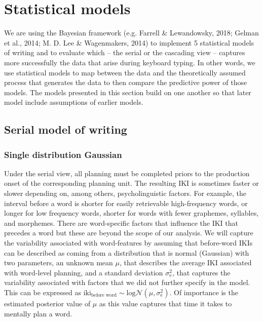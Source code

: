 \documentclass[
  man,floatsintext]{apa7}
\begin{document}
\newpage

\hypertarget{appendix-appendix}{%
\appendix}


\hypertarget{statistical-models}{%
\section{Statistical models}\label{statistical-models}}

We are using the Bayesian framework (e.g. Farrell \& Lewandowsky, 2018; Gelman et al., 2014; M. D. Lee \& Wagenmakers, 2014) to implement 5 statistical models of writing and to evaluate which -- the serial or the cascading view -- captures more successfully the data that arise during keyboard typing. In other words, we use statistical models to map between the data and the theoretically assumed process that generates the data to then compare the predictive power of those models. The models presented in this section build on one another so that later model include assumptions of earlier models.

\hypertarget{serial-model-of-writing}{%
\subsection{Serial model of writing}\label{serial-model-of-writing}}

\hypertarget{single-distribution-gaussian}{%
\subsubsection{Single distribution Gaussian}\label{single-distribution-gaussian}}

Under the serial view, all planning must be completed priors to the production onset of the corresponding planning unit. The resulting IKI is sometimes faster or slower depending on, among others, psycholinguistic factors. For example, the interval before a word is shorter for easily retrievable high-frequency words, or longer for low frequency words, shorter for words with fewer graphemes, syllables, and morphemes. There are word-specific factors that influence the IKI that precedes a word but these are beyond the scope of our analysis. We will capture the variability associated with word-features by assuming that before-word IKIs can be described as coming from a distribution that is normal (Gaussian) with two parameters, an unknown mean \(\mu\), that describes the average IKI associated with word-level planning, and a standard deviation \(\sigma_\text{e}^2\), that captures the variability associated with factors that we did not further specify in the model. This can be expressed as \(\text{iki}_\text{before word} \sim \text{log}\mathcal{N}(\mu, \sigma_\text{e}^2)\). Of importance is the estimated posterior value of \(\mu\) as this value captures that time it takes to mentally plan a word.
\end{document}
